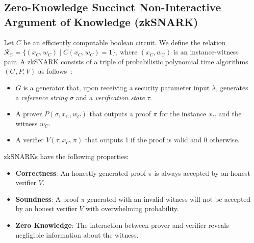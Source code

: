 \subsection{Zero-Knowledge Succinct Non-Interactive Argument of Knowledge (zkSNARK)}
Let $C$ be an efficiently computable boolean circuit.
We define the relation $\mathcal{R}_C = \{(x_C, w_C) \mid C(x_C, w_C) = 1 \}$, where $(x_C, w_C)$ is an instance-witness pair.
A zkSNARK consists of a triple of probabilistic polynomial time algorithms $(G, P, V)$ as follows~\cite{snark_defn,groth_snark}:
\begin{itemize}
    \item $G$ is a generator that, upon receiving a security parameter input $\lambda$, generates a \emph{reference string} $\sigma$ and a \emph{verification state} $\tau$.
    \item A prover $P(\sigma, x_C, w_C)$ that outputs a proof $\pi$ for the instance $x_C$ and the witness $w_C$.
    \item A verifier $V(\tau, x_C, \pi)$ that outputs 1 if the proof is valid and 0 otherwise.
\end{itemize}

zkSNARKs have the following properties:
\begin{itemize}
    \item \textbf{Correctness}: An honestly-generated proof $\pi$ is always accepted by an honest verifier $V$.
    \item \textbf{Soundness}: A proof $\pi$ generated with an invalid witness will not be accepted by an honest verifier $V$ with overwhelming probability.
    \item \textbf{Zero Knowledge}: The interaction between prover and verifier reveals negligible information about the witness.
\end{itemize}
